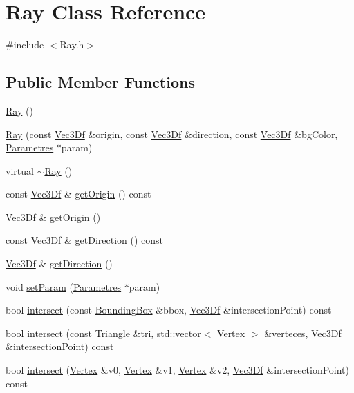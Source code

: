 \hypertarget{class_ray}{
\section{Ray Class Reference}
\label{class_ray}
}


{\ttfamily \#include $<$Ray.h$>$}

\subsection*{Public Member Functions}
\begin{DoxyCompactItemize}
\item 
\hyperlink{class_ray_a2e3d2c29f2df4ab3da10da79d4acb852}{Ray} ()
\item 
\hyperlink{class_ray_abad5657e70675cb55435231e0d636979}{Ray} (const \hyperlink{class_vec3_d}{Vec3Df} \&origin, const \hyperlink{class_vec3_d}{Vec3Df} \&direction, const \hyperlink{class_vec3_d}{Vec3Df} \&bgColor, \hyperlink{class_parametres}{Parametres} $\ast$param)
\item 
virtual \hyperlink{class_ray_ad8b0802f3178cb3cec5b45ea5b5a042e}{$\sim$Ray} ()
\item 
const \hyperlink{class_vec3_d}{Vec3Df} \& \hyperlink{class_ray_ae4225450cd5f59c1f2e2bc55b1cdcc9f}{getOrigin} () const 
\item 
\hyperlink{class_vec3_d}{Vec3Df} \& \hyperlink{class_ray_a4ffdcfc4d1e7fafe17f4e122856c3f87}{getOrigin} ()
\item 
const \hyperlink{class_vec3_d}{Vec3Df} \& \hyperlink{class_ray_a1e83e988cfd711743042c49eac092006}{getDirection} () const 
\item 
\hyperlink{class_vec3_d}{Vec3Df} \& \hyperlink{class_ray_a8005eac632a3960446e3b202a89623cd}{getDirection} ()
\item 
void \hyperlink{class_ray_a8f49b81dd458de63f8981096d88ef8cd}{setParam} (\hyperlink{class_parametres}{Parametres} $\ast$param)
\item 
bool \hyperlink{class_ray_a85653d7f19e1b15783417898152d4ab9}{intersect} (const \hyperlink{class_bounding_box}{BoundingBox} \&bbox, \hyperlink{class_vec3_d}{Vec3Df} \&intersectionPoint) const 
\item 
bool \hyperlink{class_ray_ab4ef2d8047d3061177e803c6a3b4c55a}{intersect} (const \hyperlink{class_triangle}{Triangle} \&tri, std::vector$<$ \hyperlink{class_vertex}{Vertex} $>$ \&verteces, \hyperlink{class_vec3_d}{Vec3Df} \&intersectionPoint) const 
\item 
bool \hyperlink{class_ray_a0f428b1df8e9ffb8c0685c24c5a02a62}{intersect} (\hyperlink{class_vertex}{Vertex} \&v0, \hyperlink{class_vertex}{Vertex} \&v1, \hyperlink{class_vertex}{Vertex} \&v2, \hyperlink{class_vec3_d}{Vec3Df} \&intersectionPoint) const 

\end{DoxyCompactItemize}
